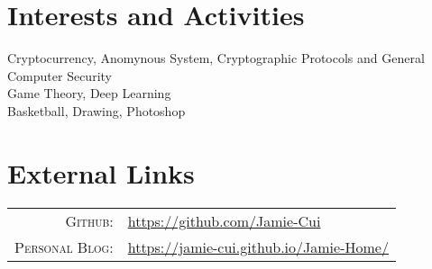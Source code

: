 \documentclass[a4paper,10pt]{article}
\begin{document}
\section{Interests and Activities}
Cryptocurrency, Anomynous System, Cryptographic Protocols and General Computer Security\\
Game Theory, Deep Learning\\
Basketball, Drawing, Photoshop

\section{External Links}
\begin{tabular}{rl}
    \textsc{Github:}    & \href{https://github.com/Jamie-Cui}{https://github.com/Jamie-Cui}\\
    \textsc{Personal Blog:}& \href{https://jamie-cui.github.io/Jamie-Home/}{https://jamie-cui.github.io/Jamie-Home/}
\end{tabular}

		
		
\end{document}
